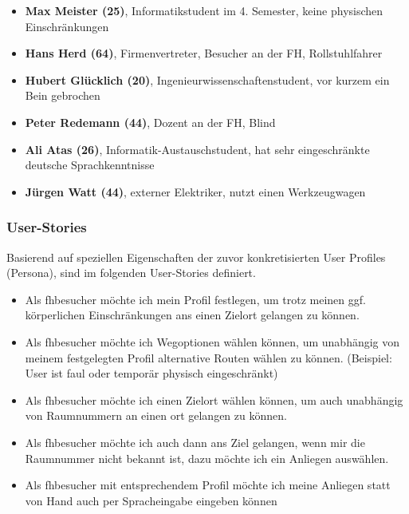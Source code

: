 \begin{itemize}
  \item \textbf{Max Meister (25)}, Informatikstudent im 4. Semester, keine physischen Einschränkungen
  \item \textbf{Hans Herd (64)}, Firmenvertreter, Besucher an der FH, Rollstuhlfahrer
  \item \textbf{Hubert Glücklich (20)}, Ingenieurwissenschaftenstudent, vor kurzem ein Bein gebrochen
  \item \textbf{Peter Redemann (44)}, Dozent an der FH, Blind
  \item \textbf{Ali Atas (26)}, Informatik-Austauschstudent, hat sehr eingeschränkte deutsche Sprachkenntnisse
  \item \textbf{Jürgen Watt (44)}, externer Elektriker, nutzt einen Werkzeugwagen 
\end{itemize}

\subsubsection*{User-Stories}
Basierend auf speziellen Eigenschaften der zuvor konkretisierten User Profiles (Persona), sind im folgenden User-Stories definiert.
\begin{itemize}
\item Als \gls{fhbesucher} möchte ich mein Profil festlegen, um trotz meinen ggf. körperlichen Einschränkungen ans einen Zielort gelangen zu können.
\item Als \gls{fhbesucher} möchte ich Wegoptionen wählen können, um unabhängig von meinem festgelegten Profil alternative Routen wählen zu können. (Beispiel: User ist faul oder temporär physisch eingeschränkt)
\item Als \gls{fhbesucher} möchte ich einen Zielort wählen können, um auch unabhängig von Raumnummern an einen \gls{ort} gelangen zu können.
\item Als \gls{fhbesucher} möchte ich auch dann ans Ziel gelangen, wenn mir die Raumnummer nicht bekannt ist, dazu möchte ich ein Anliegen auswählen.
\item Als \gls{fhbesucher} mit entsprechendem Profil möchte ich meine Anliegen statt von Hand auch per Spracheingabe eingeben können
\end{itemize}

\newpage

